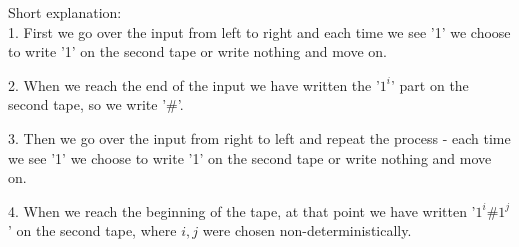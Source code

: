 Short explanation: \\
1. First we go over the input from left to right and each time we see '1' we choose
to write '1' on the second tape or write nothing and move on.

2. When we reach the end of the input we have written the '$1^i$' part on the second tape, so we write '$\#$'.

3. Then we go over the input from right to left and repeat the process - each time we
see '1' we choose to write '1' on the second tape or write nothing and move on.

4. When we reach the beginning of the tape, at that point we have written '$1^i\#1^j$' on the second tape,
where $i, j$ were chosen non-deterministically.
